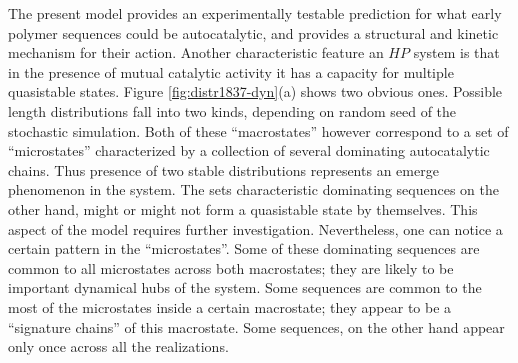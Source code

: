 \documentclass[journal=jacsat,manuscript=article,layout=twocolumn]{achemso}
\begin{document}
  The present model provides an experimentally testable prediction for what early 
  polymer sequences could be autocatalytic, and provides a structural and kinetic mechanism for 
their action. 
Another characteristic 
feature an $HP$ system is that in the presence of mutual catalytic activity it has a capacity for 
multiple quasistable states. Figure \ref{fig:distr1837-dyn}(a) shows two obvious ones.
Possible 
length distributions fall into two kinds, depending on random seed of the stochastic simulation. 
Both of these ``macrostates'' however correspond to a set of ``microstates'' characterized by a 
collection of several dominating autocatalytic chains. Thus presence of two stable distributions 
represents an emerge phenomenon in the system.
The sets characteristic dominating sequences on the other hand, might or might not form a 
quasistable state by themselves. This aspect of the model requires further investigation. 
Nevertheless, one can notice a certain pattern in the ``microstates''.
Some of these dominating sequences are common to 
all microstates across both macrostates; they are likely to be important dynamical hubs of the 
system. Some sequences are common to the most of the microstates inside a certain macrostate; they 
appear to be a ``signature chains'' of this macrostate. Some sequences, on the other hand appear 
only once across all the realizations. 
\end{document}

